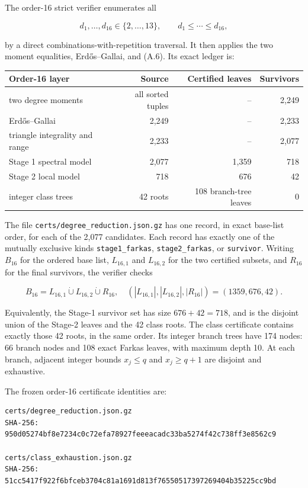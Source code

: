 \documentclass[
  english,
  11pt,
  a4paper,
]{article}
\newcounter{none} %
\begin{document}
The order-16 strict verifier enumerates all

\[
d_1,\ldots,d_{16}\in\{2,\ldots,13\},
\qquad d_1\le\cdots\le d_{16},
\]

by a direct combinations-with-repetition traversal. It then applies the
two moment equalities, Erdős--Gallai, and (A.6). Its exact ledger is:

{\def\LTcaptype{none} %
\begin{longtable}[]{@{}lrrr@{}}
\toprule\noalign{}
Order-16 layer & Source & Certified leaves & Survivors \\
\midrule\noalign{}
\endhead
\bottomrule\noalign{}
\endlastfoot
two degree moments & all sorted tuples & -- & 2,249 \\
Erdős--Gallai & 2,249 & -- & 2,233 \\
triangle integrality and range & 2,233 & -- & 2,077 \\
Stage 1 spectral model & 2,077 & 1,359 & 718 \\
Stage 2 local model & 718 & 676 & 42 \\
integer class trees & 42 roots & 108 branch-tree leaves & 0 \\
\end{longtable}
}

The file \texttt{certs/degree\_reduction.json.gz} has one record, in
exact base-list order, for each of the 2,077 candidates. Each record has
exactly one of the mutually exclusive kinds \texttt{stage1\_farkas},
\texttt{stage2\_farkas}, or \texttt{survivor}. Writing \(B_{16}\) for
the ordered base list, \(L_{16,1}\) and \(L_{16,2}\) for the two
certified subsets, and \(R_{16}\) for the final survivors, the verifier
checks

\[
B_{16}=L_{16,1}\mathbin{\dot\cup}L_{16,2}
              \mathbin{\dot\cup}R_{16},
\quad
(|L_{16,1}|,|L_{16,2}|,|R_{16}|)=(1359,676,42).
\tag{A.7}
\]

Equivalently, the Stage-1 survivor set has size \(676+42=718\), and is
the disjoint union of the Stage-2 leaves and the 42 class roots. The
class certificate contains exactly those 42 roots, in the same order.
Its integer branch trees have 174 nodes: 66 branch nodes and 108 exact
Farkas leaves, with maximum depth 10. At each branch, adjacent integer
bounds \(x_j\le q\) and \(x_j\ge q+1\) are disjoint and exhaustive.

The frozen order-16 certificate identities are:

\begin{verbatim}
certs/degree_reduction.json.gz
SHA-256: 950d05274bf8e7234c0c72efa78927feeeacadc33ba5274f42c738ff3e8562c9

certs/class_exhaustion.json.gz
SHA-256: 51cc5417f922f6bfceb3704c81a1691d813f76550517397269404b35225cc9bd
\end{verbatim}
\end{document}
